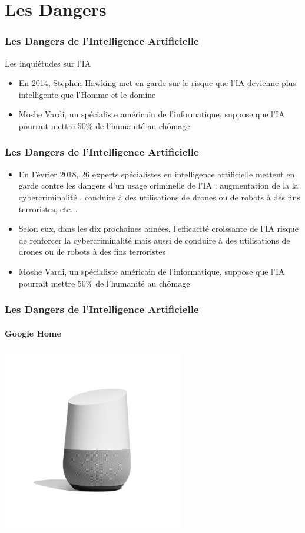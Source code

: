\documentclass{beamer}
\begin{document}
	
	\section{Les Dangers}
	\begin{frame}
	\frametitle{Les Dangers de l'Intelligence Artificielle}
	\begin{block}{Les inquiétudes sur l'IA}
	\begin{itemize}
	\itemsep1em
		\item En 2014, Stephen Hawking met en garde sur le risque que l'IA devienne plus intelligente que l'Homme et le domine
		\item Moshe Vardi, un spécialiste américain de l'informatique, suppose que l'IA pourrait mettre 50\% de l'humanité au chômage
		\end{itemize}
	\end{block}

	\end{frame}
	
	\begin{frame}
	\frametitle{Les Dangers de l'Intelligence Artificielle}
	\begin{itemize}
	\itemsep1em
		\item En Février 2018, 26 experts spécialistes en intelligence artificielle mettent en garde contre les dangers d'un usage criminelle de l'IA : augmentation de la la cybercriminalité , conduire à des utilisations de drones ou de robots à des fins terroristes, etc...
		\item Selon eux, dans les dix prochaines années, l'efficacité croissante de l'IA risque de renforcer la cybercriminalité mais aussi de conduire à des utilisations de drones ou de robots à des fins terroristes
		\item Moshe Vardi, un spécialiste américain de l'informatique, suppose que l'IA pourrait mettre 50\% de l'humanité au chômage
		\end{itemize}
	\end{frame}

	\begin{frame}
	\frametitle{Les Dangers de l'Intelligence Artificielle}
	\framesubtitle{Google Home}
	\centerline{\includegraphics[height=8cm]{googlehome.png}}
	\end{frame}
	
\end{document}
